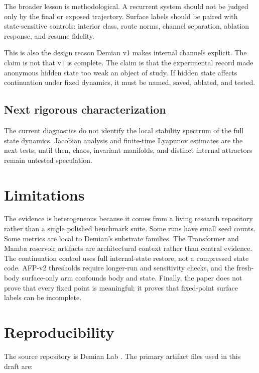 \documentclass[11pt]{article}
\begin{document}
The broader lesson is methodological. A recurrent system should not be judged
only by the final or exposed trajectory. Surface labels should be paired with
state-sensitive controls: interior class, route norms, channel separation,
ablation response, and resume fidelity.

This is also the design reason Demian v1 makes internal channels explicit. The
claim is not that v1 is complete. The claim is that the experimental record
made anonymous hidden state too weak an object of study. If hidden state affects continuation under fixed dynamics, it must be named,
saved, ablated, and tested.

\subsection{Next rigorous characterization}

The current diagnostics do not identify the local stability spectrum of the
full state dynamics. Jacobian analysis and finite-time Lyapunov estimates are
the next tests; until then, chaos, invariant manifolds, and distinct internal
attractors remain untested speculation.

\section{Limitations}

The evidence is heterogeneous because it comes from a living research
repository rather than a single polished benchmark suite. Some runs have small
seed counts. Some metrics are local to Demian's substrate families. The
Transformer and Mamba reservoir artifacts are architectural context rather
than central evidence. The continuation control uses full internal-state restore, not a compressed state code. AFP-v2 thresholds require longer-run and sensitivity checks, and the fresh-body surface-only arm confounds body and state. Finally, the paper does not prove that
every fixed point is meaningful; it proves that fixed-point surface labels can
be incomplete.

\section{Reproducibility}

The source repository is Demian Lab \citep{demianlab2026}. The primary
artifact files used in this draft are:
\end{document}
